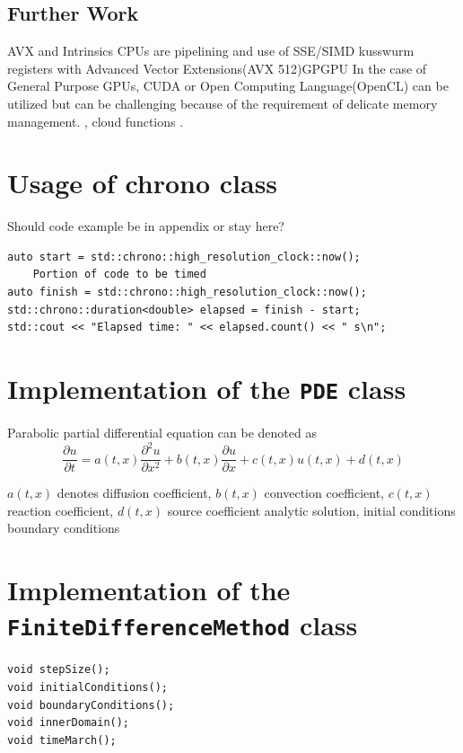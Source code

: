 \documentclass[12pt, oneside]{book}
\theoremstyle{plain}
\theoremstyle{definition}
\begin{document}
\section{Further Work}
AVX and Intrinsics CPUs are pipelining and use of SSE/SIMD kusswurm registers with Advanced Vector Extensions(AVX 512)GPGPU In the case of General Purpose GPUs, CUDA or Open Computing Language(OpenCL) can be utilized but can be challenging because of the requirement of delicate memory management. \cite{fpga},  cloud functions \cite{cloudfunc}.


\appendix
\chapter{Usage of chrono class}
Should code example be in appendix or stay here?
\begin{verbatim}
auto start = std::chrono::high_resolution_clock::now();
    Portion of code to be timed
auto finish = std::chrono::high_resolution_clock::now();
std::chrono::duration<double> elapsed = finish - start;
std::cout << "Elapsed time: " << elapsed.count() << " s\n";
\end{verbatim}

\chapter{Implementation of the {\tt PDE} class}
Parabolic partial differential equation can be denoted as
$$ \frac{\partial u}{\partial t} = a(t,x) \frac{\partial^2 u}{\partial x^2} + b(t,x) \frac{\partial u}{\partial x} + c(t,x) u(t,x) + d(t,x) $$

$a(t,x)$ denotes diffusion coefficient,  $b(t,x)$ convection coefficient, $c(t,x)$ reaction coefficient, $d(t,x)$ source coefficient
analytic solution, initial conditions boundary conditions
\chapter{Implementation of the {\tt FiniteDifferenceMethod} class}

\begin{verbatim}
void stepSize();
void initialConditions();
void boundaryConditions();
void innerDomain();
void timeMarch();
\end{verbatim}





\end{document}
